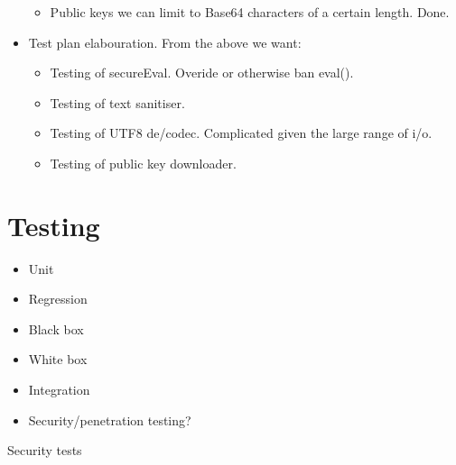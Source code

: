\begin{itemize}
\begin{itemize}
                \item Public keys we can limit to Base64 characters of a certain length. Done.
            \end{itemize}
            \item Test plan elabouration. From the above we want:
            \begin{itemize}
                \item Testing of secureEval. Overide or otherwise ban eval().
                \item Testing of text sanitiser.
                \item Testing of UTF8 de/codec. Complicated given the large range of i/o.
                \item Testing of public key downloader.
            \end{itemize}
        \end{itemize}
        
        \section{Testing}
    \begin{itemize}
        \item Unit
        \item Regression
        \item Black box
        \item White box
        \item Integration
        \item Security/penetration testing?
    \end{itemize}
    
    Security tests
    
